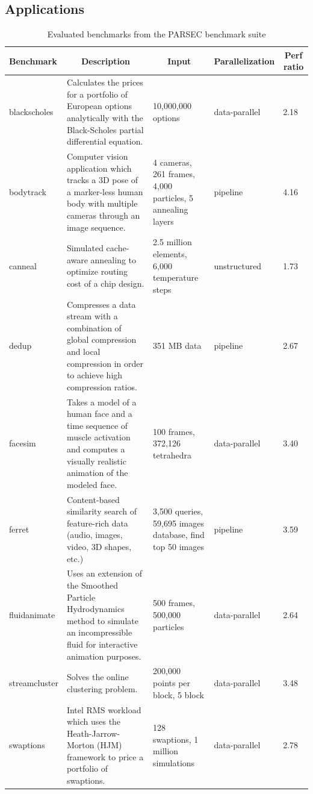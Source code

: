 \subsection{Applications}
\label{sec:applications}
\begin{table}[!t]
	\centering
	\scriptsize
	\caption{Evaluated benchmarks from the PARSEC benchmark suite}
	
	\setlength{\tabcolsep}{4pt}
	\begin{tabular}{|p{1.3cm}|p{7cm}|p{3cm}|p{1.6cm}|p{1cm}|}
	\hline
	\textbf{Benchmark} & \multicolumn{1}{|c|}{\textbf{Description}} & \multicolumn{1}{|c|}{\textbf{Input}} & \textbf{Parallelization} &\multicolumn{1}{|c|}{\textbf{Perf ratio}} \\
	\hline \hline
	blackscholes & Calculates the prices for a portfolio of European options analytically with the Black-Scholes partial differential equation. & 10,000,000 options & data-parallel &2.18 \\ \hline
	bodytrack & Computer vision application which tracks a 3D pose of a marker-less human body with multiple cameras through an image sequence. & 4 cameras, 261 frames, 4,000 particles, 5 annealing layers & pipeline & 4.16 \\ \hline
	canneal & Simulated cache-aware annealing to optimize routing cost of a chip design. & 2.5 million elements, 6,000 temperature steps & unstructured & 1.73 \\ \hline
	dedup & Compresses a data stream with a combination of global compression and local compression in order to achieve high compression ratios. & 351 MB data & pipeline & 2.67 \\ \hline
	facesim & Takes a model of a human face and a time sequence of muscle activation and computes a visually realistic animation of the modeled face. & 100 frames, 372,126 tetrahedra & data-parallel & 3.40 \\ \hline
	ferret & Content-based similarity search of feature-rich data (audio, images, video, 3D shapes, etc.) & 3,500 queries, 59,695 images database, find top 50 images & pipeline & 3.59 \\ \hline
	fluidanimate & Uses an extension of the Smoothed Particle Hydrodynamics method to simulate an incompressible fluid for interactive animation purposes. & 500 frames, 500,000 particles & data-parallel & 2.64 \\ \hline
	streamcluster & Solves the online clustering problem. & 200,000 points per block, 5 block & data-parallel & 3.48 \\ \hline
	swaptions & Intel RMS workload which uses the Heath-Jarrow-Morton (HJM) framework to price a portfolio of swaptions. & 128 swaptions, 1 million  simulations & data-parallel & 2.78 \\ \hline
	\end{tabular}
	\label{tab:parsec}
	\vspace{-0.3cm}
\end{table}

